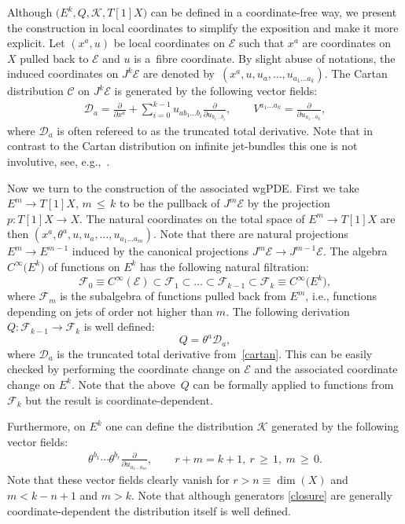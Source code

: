 \documentclass[10pt,a4paper]{amsart}
\numberwithin{equation}{section}
\theoremstyle{definition}
\newcommand{\changed}[1]{{#1}}
\newcommand{\cF}{\mathcal{F}}
\renewcommand{\geq}{\,{\geqslant}\,}
\renewcommand{\leq}{\,{\leqslant}\,}
\def\cD{\mathcal{D}}
\def\cE{\mathcal{E}}
\def\cK{\mathcal{K}}
\begin{document}
Although $\bigl(E^k,Q,\cK,T[1]X\bigr)$ can be defined in a coordinate-free way, we present the construction in local coordinates to simplify the exposition and make it more explicit. Let $(x^a,u)$ be local coordinates on $\cE$ such that $x^a$ are coordinates on $X$ pulled back to $\cE$ and $u$ is a~fibre coordinate. By slight abuse of notations, the induced coordinates on $J^k\mathcal{E}$ are denoted by~$(x^a,u,u_a,\dots,u_{a_1\dots a_k})$. The Cartan distribution $\mathcal{C}$ on $J^k\mathcal{E}$ is generated by the following vector fields:
\begin{gather}\label{cartan}
 \mathcal{D}_a=\frac{\partial}{\partial x^a}+\sum^{k-1}_{i=0}u_{a b_1\dots b_i}\frac{\partial}{\partial u_{b_1\dots b_{i}}}, \qquad V^{a_1\dots a_k}=\frac{\partial}{\partial u_{a_1\dots a_k}},
\end{gather}
where $\mathcal{D}_a$ is often refereed to as the truncated total derivative. Note that in contrast to the Cartan distribution on infinite jet-bundles this one is not involutive, see, e.g.,~\cite{Bocharov:1999}.


Now we turn to the construction of the associated wgPDE. First we take $E^m \to T[1]X$, $m\leq k$ to be the pullback of $J^m\mathcal{E}$ by the projection $p\colon T[1]X\rightarrow X$. \changed{The natural coordinates on the total space of $E^m\to T[1]X$} are then $(x^a,\theta^a,u,u_a,\dots,u_{a_1\dots a_m})$. Note that there are natural projections $E^{m}\to E^{m-1}$ induced by the canonical projections $J^m\cE\to J^{m-1}\cE $. The algebra $C^{\infty}\bigl(E^k\bigr)$ of functions on $E^k$ has the following natural filtration:
\begin{equation*}
\cF_0\equiv C^{\infty}(\cE) \subset \cF_1\subset \dots \subset \cF_{k-1}\subset \cF_k\equiv C^{\infty}\bigl(E^k\bigr),
\end{equation*}
where $\cF_m$ is the subalgebra of functions pulled back from $E^m$, i.e., functions depending on jets of order not higher than $m$. The following derivation $Q\colon \cF_{k-1}\to \cF_{k}$ is well defined:
\begin{equation*}
Q=\theta^a \cD_a,
\end{equation*}
where $\cD_a$ is the truncated total derivative from~\eqref{cartan}. This can be easily checked by performing the coordinate change on $\cE$ and the associated coordinate change on $E^k$. Note that the above~$Q$ can be formally applied to functions from $\cF_{k}$ but the result is coordinate-dependent.

Furthermore, on $E^k$ one can define the distribution $\cK$ generated by the following vector fields:
\begin{gather}\label{closure}
 \theta^{b_1}\cdots\theta^{b_r}\frac{\partial}{\partial u_{a_1\dots a_m}}, \qquad r+m=k+1, \ r\geq 1 ,\ m\geq 0.
\end{gather}
Note that these vector fields clearly vanish for $r>n\equiv \dim(X)$ and $m<k-n+1$ and $m>k$. Note that although generators \eqref{closure} are generally coordinate-dependent the distribution itself is well defined.
\end{document}
